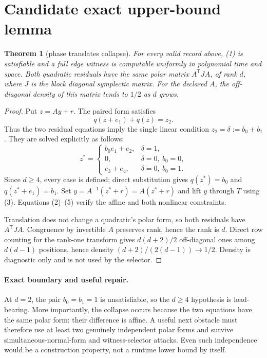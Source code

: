 \documentclass[11pt]{article}
\newtheorem{theorem}{Theorem}
\begin{document}
\section{Candidate exact upper-bound lemma}
\begin{theorem}[phase translates collapse]
For every valid record above, (1) is satisfiable and a full edge witness is
computable uniformly in polynomial time and space.  Both quadratic residuals
have the same polar matrix $A^{\mathsf T}JA$, of rank $d$, where $J$ is the
block diagonal symplectic matrix.  For the declared $A$, the off-diagonal
density of this matrix tends to $1/2$ as $d$ grows.
\end{theorem}

\begin{proof}
Put $z=Ay+r$.  The paired form satisfies
\[
 q(z+e_1)+q(z)=z_2.                                      \tag{4}
\]
Thus the two residual equations imply the single linear condition
$z_2=\delta:=b_0+b_1$.  They are solved explicitly as follows:
\[
 z^*=\begin{cases}
       b_0e_1+e_2,&\delta=1,\\
       0,&\delta=0,\ b_0=0,\\
       e_3+e_4,&\delta=0,\ b_0=1.
      \end{cases}                                        \tag{5}
\]
Since $d\ge4$, every case is defined; direct substitution gives
$q(z^*)=b_0$ and $q(z^*+e_1)=b_1$.  Set
$y=A^{-1}(z^*+r)=A(z^*+r)$ and lift $y$ through $T$ using (3).
Equations (2)--(5) verify the affine and both nonlinear constraints.

Translation does not change a quadratic's polar form, so both residuals have
$A^{\mathsf T}JA$.  Congruence by invertible $A$ preserves rank, hence the
rank is $d$.  Direct row counting for the rank-one transform gives
$d(d+2)/2$ off-diagonal ones among $d(d-1)$ positions, hence density
$(d+2)/(2(d-1))\to1/2$.  Density is diagnostic only and is not used by the
selector.
\end{proof}

\paragraph{Exact boundary and useful repair.}
At $d=2$, the pair $b_0=b_1=1$ is unsatisfiable, so the $d\ge4$ hypothesis is
load-bearing.  More importantly, the collapse occurs because the two
equations have the same polar form: their difference is affine.  A useful
next obstacle must therefore use at least two genuinely independent polar
forms and survive simultaneous-normal-form and witness-selector attacks.
Even such independence would be a construction property, not a runtime
lower bound by itself.
\end{document}
